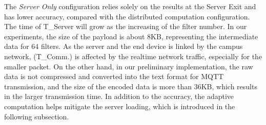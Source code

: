 \documentclass[conference]{IEEEtran}
\begin{document}
The \emph{Server Only} configuration relies solely on the results at the Server Exit and has lower accuracy, compared with the distributed computation configuration.
The time of T\_Server will grow as the increasing of the filter number. In our experiments, the size of the payload is about 8KB, representing the intermediate data for 64 filters. As the server and the end device is linked by the campus network, (T\_Comm.) is affected by the realtime network traffic, especially for the smaller packet. On the other hand, in our preliminary implementation, the raw data is not compressed and converted into the text format for MQTT transmission, and the size of the encoded data is more than 36KB, which results in the larger transmission time.
In addition to the accuracy, the adaptive computation helps mitigate the server loading, which is introduced in the following subsection.
\end{document}
